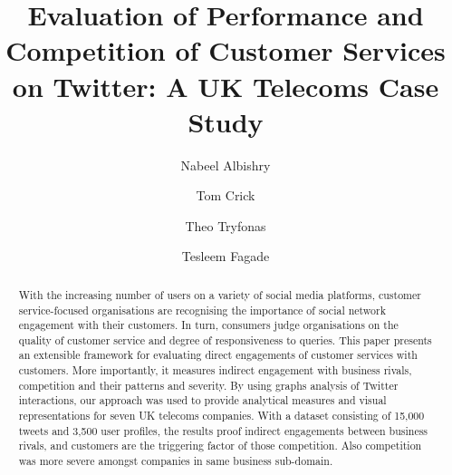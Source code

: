 \documentclass[sigconf]{acmart}
\begin{document}
\title[Evaluation of Performance and Competition of Customer Services on
  Twitter]{Evaluation of Performance and Competition of Customer Services on
  Twitter: A UK Telecoms Case Study}

\author{Nabeel Albishry}

\author{Tom Crick}

\author{Theo Tryfonas}


\author{Tesleem Fagade}



 
\renewcommand{\shortauthors}{Albishry, Crick, Tryfonas, and Fagade}


\begin{abstract}
With the increasing number of users on a variety of social media
platforms, customer service-focused organisations are recognising the
importance of social network engagement with their customers. In turn,
consumers judge organisations on the quality of customer service and
degree of responsiveness to queries. This paper presents an extensible
framework for evaluating direct engagements of customer services with
customers. More importantly, it measures indirect engagement with business rivals,
competition and their patterns and severity. By using graphs analysis
of Twitter interactions, our approach was used to provide analytical
measures and visual representations for seven UK telecoms
companies. With a dataset consisting of 15,000 tweets and 3,500 user
profiles, the results proof indirect engagements between business rivals, and 
customers are the triggering factor of those competition. 
Also competition was more severe amongst companies in same business sub-domain.
\end{abstract}

\end{document}
